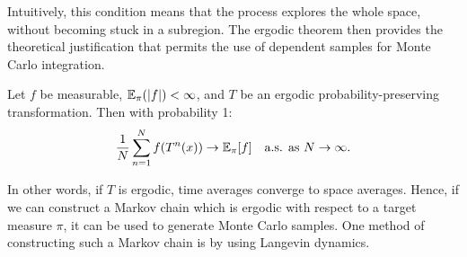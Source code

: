 Intuitively, this condition means that the process explores the whole space, without becoming stuck in a subregion.  The ergodic theorem then provides the theoretical justification that permits the use of dependent samples for Monte Carlo integration.

\begin{theorem}
 Let $f$ be measurable, $\mathbb{E}_\pi(|f|) < \infty$, and $T$ be an ergodic probability-preserving transformation. Then with probability 1:
 $$
\frac{1}{N} \sum_{n=1}^N f(T^n(x)) \to \mathbb{E}_\pi[f] \quad \text{a.s. as $N \to \infty$.}
$$
\end{theorem}
\noindent In other words, if $T$ is ergodic, time averages converge to space averages.  Hence, if we can construct a Markov chain which is ergodic with respect to a target measure $\pi$, it can be used to generate Monte Carlo samples.  One method of constructing such a Markov chain is by using Langevin dynamics.